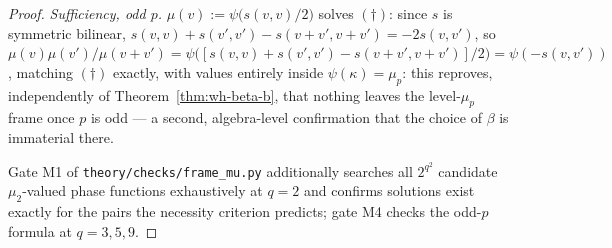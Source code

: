 \begin{proof}
\emph{Sufficiency, odd $p$.} $\mu(v):=\psi\big(s(v,v)/2\big)$ solves
$(\dagger)$: since $s$ is symmetric bilinear,
$s(v,v)+s(v',v')-s(v+v',v+v')=-2s(v,v')$, so
$\mu(v)\mu(v')/\mu(v+v') = \psi\big([s(v,v)+s(v',v')-s(v+v',v+v')]/2\big)=\psi(-s(v,v'))$,
matching $(\dagger)$ exactly, with values entirely inside $\psi(\kappa)=\mu_p$:
this reproves, independently of Theorem~\ref{thm:wh-beta-b}, that nothing
leaves the level-$\mu_p$ frame once $p$ is odd — a second, algebra-level
confirmation that the choice of $\beta$ is immaterial there.

Gate M1 of \texttt{theory\slash{}checks\slash{}frame\_mu.py} additionally searches all
$2^{q^2}$ candidate $\mu_2$-valued phase functions exhaustively at $q=2$ and
confirms solutions exist exactly for the pairs the necessity criterion
predicts; gate M4 checks the odd-$p$ formula at $q=3,5,9$.
\end{proof}
